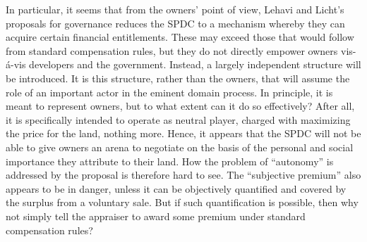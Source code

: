 In particular,  it seems that from the owners' point of view, Lehavi and Licht's proposals for governance reduces the SPDC to a mechanism whereby they can acquire certain financial entitlements. These may exceed those that would follow from standard compensation rules, but they do not directly empower owners vis-{\'a}-vis developers and the government. Instead, a largely independent structure will be introduced. It is this structure, rather than the owners, that will assume the role of an important actor in the eminent domain process. In principle, it is meant to represent owners, but to what extent can it do so effectively? After all, it is specifically intended to operate as neutral player, charged with maximizing the price for the land, nothing more. Hence, it appears that the SPDC will not be able to give owners an arena to negotiate on the basis of the personal and social importance they attribute to their land. How the problem of ``autonomy'' is addressed by the proposal is therefore hard to see. The ``subjective premium'' also appears to be in danger, unless it can be objectively quantified and covered by the surplus from a voluntary sale. But if such quantification is possible, then why not simply tell the appraiser to award some premium under standard compensation rules?

